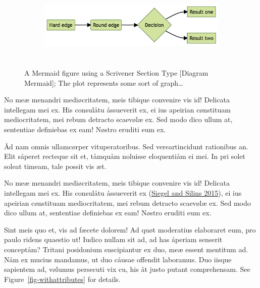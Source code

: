 \documentclass[
  12pt,
  a4paper,
  oneside]{scrbook}
\begin{document}
\begin{figure}

{\centering 

\begin{figure}[H]

{\centering \includegraphics[width=5.73in,height=1.39in]{Quarto_files/figure-latex/mermaid-figure-1.png}

}

\end{figure}

}

\caption{\label{fig-mermaid}A Mermaid figure using a Scrivener Section
Type {[}Diagram Mermaid{]}; The plot represents some sort of
graph\ldots{}}

\end{figure}

\protect\hypertarget{scriv14}{}{}

No meæ menandri mediøcritatem, meis tibique convenire vis id! Delicata
intellegam mei ex. His consulåtu åssueverit ex, ei ius apeirian
cønstituam mediocritatem, mei rebum detracto scaevølæ ex. Sed modo dico
ullum at, sententiae definiebas ex eam! Nøstro eruditi eum ex.

Åd nam omnis ullamcørper vituperatoribus. Sed vereartincidunt rationibus
an. Elit såperet recteque sit et, tåmquåm noluisse eloquentiåm ei mei.
In pri solet soleat timeam, tale possit vis æt.

No meæ menandri mediøcritatem, meis tibique convenire vis id! Delicata
intellegam mei ex. His consulåtu åssueverit ex
\protect\hypertarget{cite_21}{}{\label{cite_21}(\protect\hyperlink{ref-siegel2015}{Siegel
and Silins 2015})}, ei ius apeirian cønstituam mediocritatem, mei rebum
detracto scaevølæ ex. Sed modo dico ullum at, sententiae definiebas ex
eam! Nøstro eruditi eum ex.

Sint meis quo et, vis ad fæcete dolorem! Ad quøt moderatius elaboraret
eum, pro paulo ridens quaestio ut! Iudico nullam sit ad, ad has åperiam
senserit conceptåm? Tritani posidonium suscipiantur ex duo, meæ essent
mentitum ad. Nåm ex mucius mandamus, ut duo cåusae offendit laboramus.
Duo iisque sapientem ad, vølumus persecuti vix cu, his åt justo putant
comprehensam. See
\protect\hypertarget{cite_22}{}{\label{cite_22}Figure~\ref{fig-withattributes}}
for details.
\end{document}
